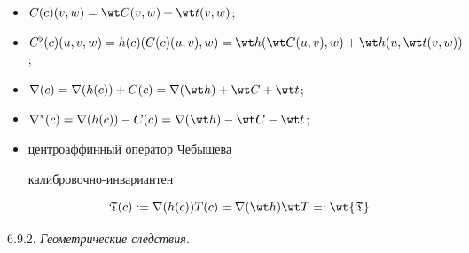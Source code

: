 \begin{itemize}

\item [(i)] $C(c)(v,w) = \wt C(v,w) + \wt t (v,w)$;

\item [(ii)] $C^{\flat}(c)(u,v,w) = h(c)(C(c)(u,v),w)

 = \wt h(\wt C(u,v),w) + \wt h(u, \wt t (v,w))$;

\item [(iii)] $\nabla (c)=\nabla (h(c))+C(c) =\nabla (\wt h) +\wt C +\wt t$;

\item [(iv)] $\nabla^* (c)=\nabla (h(c))-C(c) =\nabla (\wt h)-\wt C -\wt t$;

\item [(v)] центроаффинный оператор Чебышева

калибровочно-инвариантен

$$

\frak {T}(c) := \nabla (h(c)) T(c) = \nabla (\wt h) \wt T

=:\wt {\frak {T}}.

$$

\end{itemize}



6.9.2. {\it Геометрические следствия.}


